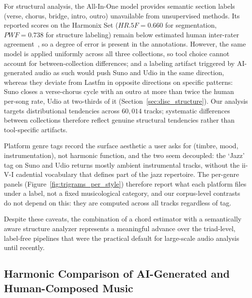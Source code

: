 \documentclass{article}
\begin{document}
For structural analysis, the All-In-One model provides semantic section labels (verse, chorus, bridge, intro, outro) unavailable from unsupervised methods. Its reported scores on the Harmonix Set ($HR.5F = 0.660$ for segmentation, $PWF = 0.738$ for structure labeling) remain below estimated human inter-rater agreement~\citep{nieto2020audio}, so a degree of error is present in the annotations. However, the same model is applied uniformly across all three collections, so tool choice cannot account for between-collection differences; and a labeling artifact triggered by AI-generated audio as such would push Suno and Udio in the same direction, whereas they deviate from Lastfm in opposite directions on specific patterns: Suno closes a verse-chorus cycle with an outro at more than twice the human per-song rate, Udio at two-thirds of it (Section~\ref{sec:disc_structure}). Our analysis targets distributional tendencies across $60,014$ tracks; systematic differences between collections therefore reflect genuine structural tendencies rather than tool-specific artifacts.

Platform genre tags record the surface aesthetic a user asks for (timbre, mood, instrumentation), not harmonic function, and the two seem decoupled: the `Jazz' tag on Suno and Udio returns mostly ambient instrumental tracks, without the ii-V-I cadential vocabulary that defines part of the jazz repertoire. The per-genre panels (Figure~\ref{fig:trigrams_per_style}) therefore report what each platform files under a label, not a fixed musicological category, and our corpus-level contrasts do not depend on this: they are computed across all tracks regardless of tag.

Despite these caveats, the combination of a chord estimator with a semantically aware structure analyzer represents a meaningful advance over the triad-level, label-free pipelines that were the practical default for large-scale audio analysis until recently.

\subsection{Harmonic Comparison of AI-Generated and Human-Composed Music}
\label{sec:disc_harmony}
\end{document}
